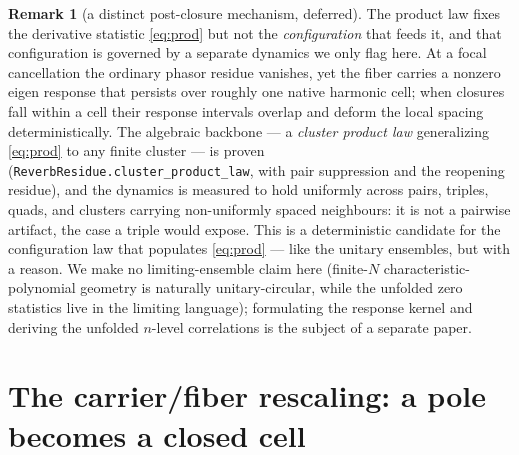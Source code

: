 \documentclass[11pt]{article}
\theoremstyle{definition}
\newtheorem{remark}[theorem]{Remark}
\begin{document}
\begin{remark}[a distinct post-closure mechanism, deferred]\label{rem:reverb}
The product law fixes the derivative statistic \eqref{eq:prod} but not the \emph{configuration} that
feeds it, and that configuration is governed by a separate dynamics we only flag here. At a focal
cancellation the ordinary phasor residue vanishes, yet the fiber carries a nonzero eigen response that
persists over roughly one native harmonic cell; when closures fall within a cell their response
intervals overlap and deform the local spacing deterministically. The algebraic backbone --- a
\emph{cluster product law} generalizing \eqref{eq:prod} to any finite cluster --- is proven
(\texttt{ReverbResidue.cluster\_product\_law}, with pair suppression and the reopening residue), and
the dynamics is measured to hold uniformly across pairs, triples, quads, and clusters carrying
non-uniformly spaced neighbours: it is not a pairwise artifact, the case a triple would expose. This is
a deterministic candidate for the configuration law that populates \eqref{eq:prod} --- like the
unitary ensembles, but with a reason. We make no limiting-ensemble claim here (finite-$N$
characteristic-polynomial geometry is naturally unitary-circular, while the unfolded zero statistics
live in the limiting language); formulating the response kernel and deriving the unfolded $n$-level
correlations is the subject of a separate paper.
\end{remark}

\section{The carrier/fiber rescaling: a pole becomes a closed cell}\label{sec:carrier}
\end{document}
